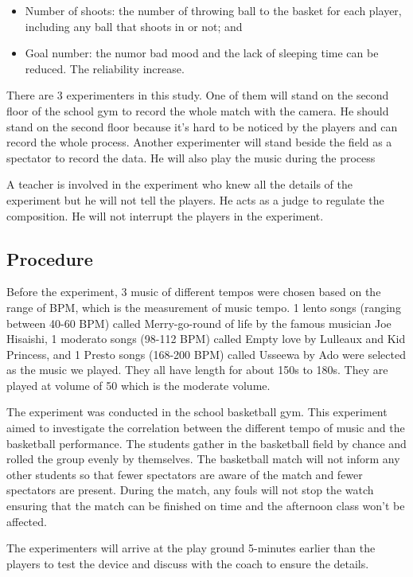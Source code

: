 \documentclass[man,floatsintext]{apa7}
\begin{document}
\begin{itemize}
\item Number of shoots: the number of throwing ball to the basket for each player, including any ball that shoots in or not; and
\item Goal number: the numor bad mood and the lack of sleeping time can be reduced. The reliability increase.
\end{itemize}

There are 3 experimenters in this study. One of them will stand on the second floor of the school gym to record the whole match with the camera. He should stand on the second floor because it's hard to be noticed by the players and can record the whole process. Another experimenter will stand beside the field as a spectator to record the data. He will also play the music during the process

A teacher is involved in the experiment who knew all the details of the experiment but he will not tell the players. He acts as a judge to regulate the composition. He will not interrupt the players in the experiment. 

\subsection{Procedure}

Before the experiment, 3 music of different tempos were chosen based on the range of BPM, which is the measurement of music tempo. 1 lento songs (ranging between 40-60 BPM) called Merry-go-round of life by the famous musician Joe Hisaishi, 1 moderato songs (98-112 BPM) called Empty love by Lulleaux and Kid Princess, and 1 Presto songs (168-200 BPM) called Usseewa by Ado were selected as the music we played.\autocite{HelloMusicTheory2022} They all have length for about 150s to 180s. They are played at volume of 50 which is the moderate volume.

The experiment was conducted in the school basketball gym. This experiment aimed to investigate the correlation between the different tempo of music and the basketball performance. The students gather in the basketball field by chance and rolled the group evenly by themselves. The basketball match will not inform any other students so that fewer spectators are aware of the match and fewer spectators are present. During the match, any fouls will not stop the watch ensuring that the match can be finished on time and the afternoon class won't be affected.

The experimenters will arrive at the play ground 5-minutes earlier than the players to test the device and discuss with the coach to ensure the details. 
\end{document}
